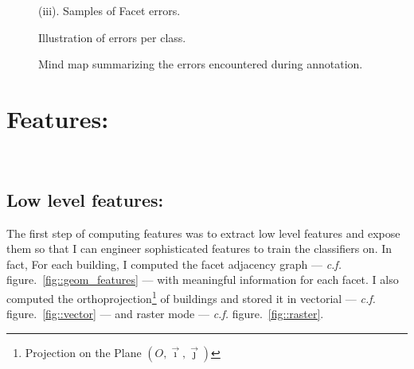 \documentclass[a4paper, 11pt]{article}
\begin{document}
\begin{figure}
\begin{center}
{{\begin{subfloatrow}[4]
					\end{subfloatrow}
				}
				{
					\caption*{(iii). Samples of Facet errors.}
				}
			}
			{
				\caption{\label{fig::samples}Illustration of errors per class.}
			}
		\end{center}
	\end{figure}

	\begin{landscape}
		\begin{figure}
			\begin{center}
				
				\caption{\label{fig::mindmap_errors} Mind map summarizing the errors encountered during annotation.}
			\end{center}
		\end{figure}
	\end{landscape}

	\section{Features:}
~\\

	\subsection{Low level features:}


	The first step of computing features was to extract low level features and expose them so that I can engineer sophisticated features to train the classifiers on. In fact, For each building, I computed the facet adjacency graph --- \textit{c.f.} figure.~\ref{fig::geom_features} --- with meaningful information for each facet. I also computed the orthoprojection\footnote{Projection on the Plane $(O, \vec{\imath}, \vec{\jmath})$} of buildings and stored it in vectorial --- \textit{c.f.} figure.~\ref{fig::vector} --- and raster mode --- \textit{c.f.} figure.~\ref{fig::raster}.\\
\end{document}
